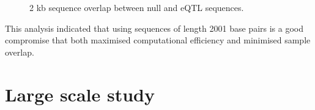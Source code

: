 \documentclass[12pt]{article}
\begin{document}
\begin{figure}[!htbp]%
\centering
{}%
\qquad
{}
\caption{2 kb sequence overlap between null and eQTL sequences.} \label{2kbOverlaps}%
\end{figure}  

This analysis indicated that using sequences of length 2001 base pairs is a good compromise that both maximised computational efficiency and minimised sample overlap.
 

\section{Large scale study} 
\end{document}
